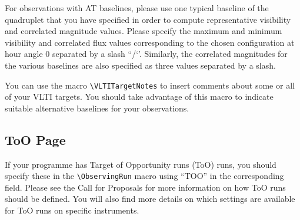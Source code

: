 \documentclass{article}
\begin{document}

For observations with AT baselines, please use one typical baseline of the
quadruplet that you have specified in order to compute
representative visibility and correlated magnitude values.
Please specify the maximum and minimum visibility and correlated flux values
corresponding to the chosen configuration at hour angle 0 separated by 
a slash ``/‘’. Similarly, the correlated magnitudes for the various baselines are also
specified as three values separated by a slash.

You can use the macro \verb|\VLTITargetNotes| to insert comments about
some or all of your VLTI targets. You should take advantage of this
macro to indicate suitable alternative baselines for your
observations.

\subsection{ToO Page}
\label{sec:toopage}

If your programme has Target of Opportunity runs (ToO) runs, 
you should specify these in the  \verb|\ObservingRun| macro 
using ``TOO'' in the corresponding field. 
Please see the Call for Proposals for more information on how ToO runs should be defined.
You will also find more details on which settings are available for ToO runs on specific instruments.
\end{document}
